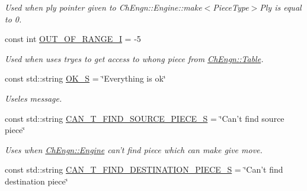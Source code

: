 \begin{DoxyCompactItemize}
\begin{DoxyCompactList}\small\item\em Used when ply pointer given to ChEngn::Engine::make$<$PieceType$>$Ply is equal to 0. \item\end{DoxyCompactList}\item 
\hypertarget{namespaceChEngn_a1afece927fee62ec6ba3fc3f600db014}{
const int \hyperlink{namespaceChEngn_a1afece927fee62ec6ba3fc3f600db014}{OUT\_\-OF\_\-RANGE\_\-I} = -\/5}
\label{namespaceChEngn_a1afece927fee62ec6ba3fc3f600db014}

\begin{DoxyCompactList}\small\item\em Used when uses tryes to get access to whong piece from \hyperlink{classChEngn_1_1Table}{ChEngn::Table}. \item\end{DoxyCompactList}\item 
\hypertarget{namespaceChEngn_a669b96f20597d4a0b00d4c9e4db68ee8}{
const std::string \hyperlink{namespaceChEngn_a669b96f20597d4a0b00d4c9e4db68ee8}{OK\_\-S} = \char`\"{}Everything is ok\char`\"{}}
\label{namespaceChEngn_a669b96f20597d4a0b00d4c9e4db68ee8}

\begin{DoxyCompactList}\small\item\em Useles message. \item\end{DoxyCompactList}\item 
\hypertarget{namespaceChEngn_afcb9219c354a7e8e1374e15cd5be767f}{
const std::string \hyperlink{namespaceChEngn_afcb9219c354a7e8e1374e15cd5be767f}{CAN\_\-T\_\-FIND\_\-SOURCE\_\-PIECE\_\-S} = \char`\"{}Can't find source piece\char`\"{}}
\label{namespaceChEngn_afcb9219c354a7e8e1374e15cd5be767f}

\begin{DoxyCompactList}\small\item\em Uses when \hyperlink{classChEngn_1_1Engine}{ChEngn::Engine} can't find piece which can make give move. \item\end{DoxyCompactList}\item 
\hypertarget{namespaceChEngn_a8bc85688808005c9d9c49aa2474809d1}{
const std::string \hyperlink{namespaceChEngn_a8bc85688808005c9d9c49aa2474809d1}{CAN\_\-T\_\-FIND\_\-DESTINATION\_\-PIECE\_\-S} = \char`\"{}Can't find destination piece\char`\"{}}
\label{namespaceChEngn_a8bc85688808005c9d9c49aa2474809d1}


\end{DoxyCompactItemize}

